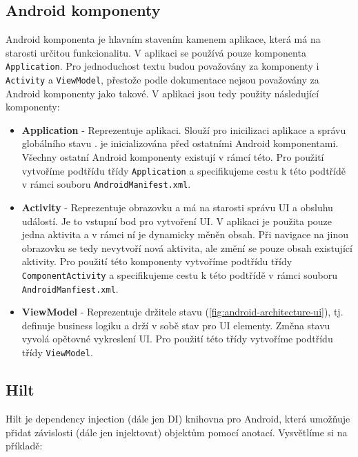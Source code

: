 \subsection *{Android komponenty}
Android komponenta \cite{android-component-application} je hlavním stavením kamenem aplikace, která má na starosti určitou funkcionalitu. V aplikaci se používá pouze komponenta \lstinline|Application|. Pro jednoduchost textu budou považovány za komponenty i \lstinline|Activity| a \lstinline|ViewModel|, přestože podle dokumentace nejsou považovány za Android komponenty jako takové. V aplikaci jsou tedy použity následující komponenty:

\begin{itemize}
	\item \textbf{Application} - Reprezentuje aplikaci. Slouží pro inicilizaci aplikace a správu globálního stavu \cite{android-component-application}. je inicializována před ostatními Android komponentami. Všechny ostatní Android komponenty existují v rámcí této. Pro použití vytvoříme podtřídu třídy \lstinline|Application| a specifikujeme cestu k této podtřídě v rámci souboru \lstinline|AndroidManifest.xml|.
	
	\item \textbf{Activity} - Reprezentuje obrazovku a má na starosti správu UI a obsluhu událostí. Je to vstupní bod pro vytvoření UI. V aplikaci je použita pouze jedna aktivita a v rámci ní je dynamicky měněn obsah. Při navigace na jinou obrazovku se tedy nevytvoří nová aktivita, ale změní se pouze obsah existující aktivity. Pro použití této komponenty vytvoříme podtřídu třídy \lstinline|ComponentActivity| a specifikujeme cestu k této podtřídě v rámci souboru \lstinline|AndroidManfiest.xml|.
	
	\item \textbf{ViewModel} - Reprezentuje držitele stavu (\ref{fig:android-architecture-ui}), tj. definuje business logiku a drží v sobě stav pro UI elementy. Změna stavu vyvolá opětovné vykreslení UI. Pro použití této třídy vytvoříme podtřídu třídy \lstinline|ViewModel|.
\end{itemize}

\subsection *{Hilt}
Hilt je dependency injection (dále jen DI) knihovna pro Android, která umožňuje přidat závislosti (dále jen injektovat) objektům pomocí anotací. Vysvětlíme si na příkladě:

\newpage

